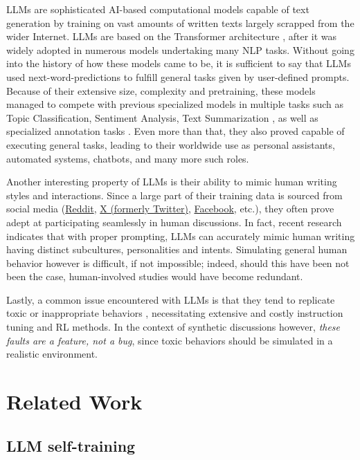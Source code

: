 \acp{LLM} are sophisticated \ac{AI}-based computational models capable of text generation by training on vast amounts of written texts largely scrapped from the wider Internet. LLMs are based on the Transformer architecture \cite{vaswani2023attentionneed}, after it was widely adopted in numerous models undertaking many \ac{NLP} tasks. Without going into the history of how these models came to be, it is sufficient to say that LLMs used next-word-predictions to fulfill general tasks given by user-defined prompts. Because of their extensive size, complexity and pretraining, these models managed to compete with  previous specialized models in multiple tasks such as Topic Classification, Sentiment Analysis, Text Summarization \cite{ts2024}, as well as specialized annotation tasks \cite{tan2024largelanguagemodelsdata}.  Even more than that, they also proved capable of executing general tasks, leading to their worldwide use as personal assistants, automated systems, chatbots, and many more such roles. 

Another interesting property of LLMs is their ability to mimic human writing styles and interactions. Since a large part of their training data is sourced from social media (\href{https://www.reddit.com}{Reddit}, \href{https://www.twitter.com}{X (formerly Twitter)}, \href{https://www.facebook.com}{Facebook}, etc.), they often prove adept at participating seamlessly in human discussions. In fact, recent research \cite{Vezhnevets2023GenerativeAM, aher2023usinglargelanguagemodels} indicates that with proper prompting, LLMs can accurately mimic human writing having distinct subcultures, personalities and intents. Simulating general human behavior however is difficult, if not impossible; indeed, should this have been not been the case, human-involved studies would have become redundant.

Lastly, a common issue encountered with LLMs is that they tend to replicate toxic or inappropriate behaviors \cite{Birkun_Gautam_2023}, necessitating extensive and costly instruction tuning and \ac{RL} methods. In the context of synthetic discussions however, \textit{these faults are a feature, not a bug}, since toxic behaviors should be simulated in a realistic environment.

\section{Related Work}
\label{sec:related:sec2}

\subsection{LLM self-training}
\label{sec:related:self-train}

